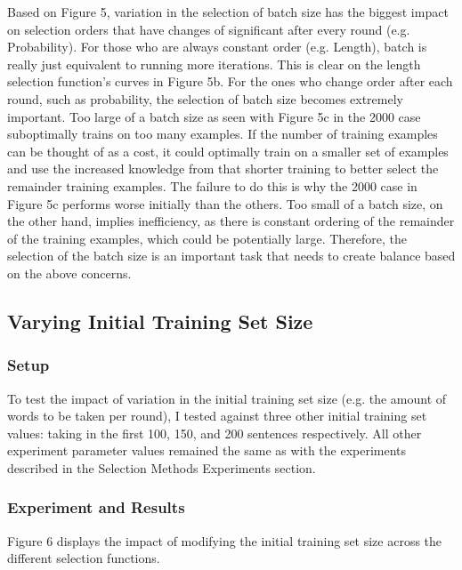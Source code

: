 \documentclass{article} %
\begin{document}
Based on Figure 5, variation in the selection of batch size has the biggest impact on selection orders that have changes of significant after every round (e.g. Probability). For those who are always constant order (e.g. Length), batch is really just equivalent to running more iterations. This is clear on the length selection function's curves in Figure 5b. For the ones who change order after each round, such as probability, the selection of batch size becomes extremely important. Too large of a batch size as seen with Figure 5c in the 2000 case suboptimally trains on too many examples. If the number of training examples can be thought of as a cost, it could optimally train on a smaller set of examples and use the increased knowledge from that shorter training to better select the remainder training examples. The failure to do this is why the 2000 case in Figure 5c performs worse initially than the others. Too small of a batch size, on the other hand, implies inefficiency, as there is constant ordering of the remainder of the training examples, which could be potentially large. Therefore, the selection of the batch size is an important task that needs to create balance based on the above concerns.

\subsection{Varying Initial Training Set Size}

\subsubsection{Setup}

To test the impact of variation in the initial training set size (e.g. the amount of words to be taken per round), I tested against three other initial training set values: taking in the first 100, 150, and 200 sentences respectively. All other experiment parameter values remained the same as with the experiments described in the Selection Methods Experiments section.

\subsubsection{Experiment and Results}

Figure 6 displays the impact of modifying the initial training set size across the different selection functions. 
\end{document}
